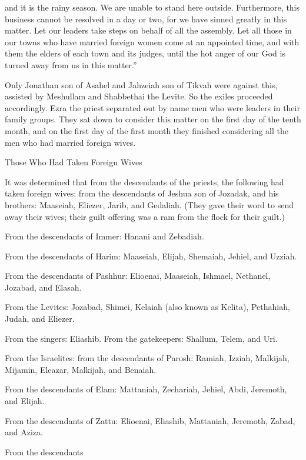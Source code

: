 {and it is the rainy
season.
We are unable
to stand
here outside.
Furthermore, this business
cannot
be resolved in a day
or
two,
for
we have sinned
greatly
in this
matter.
Let our
leaders
take steps on behalf of all
the assembly.
Let all
those
in
our towns
who
have married
foreign
women
come
at an appointed
time,
and with
them the
elders
of each town
and its judges,
until
the hot
anger
of our God
is turned away from
us in
this
matter.”
\par }{\PP {}Only
Jonathan
son
of Asahel
and Jahzeiah
son
of Tikvah
were against
this,
assisted
by Meshullam
and Shabbethai
the Levite.
So the exiles
proceeded
accordingly.
Ezra
the priest
separated out
by name
men
who were leaders
in their family groups.
They sat down
to consider
this matter
on the first
day
of the tenth
month,
and on
the first
day
of the first
month
they finished
considering
all
the men
who
had married foreign
wives.
\par }{\SH Those Who Had Taken Foreign Wives
\par }{\PP {}It
was determined
that from the descendants of
the priests,
the following
had
taken foreign
wives: from the descendants
of Jeshua
son
of Jozadak,
and his brothers: Maaseiah,
Eliezer,
Jarib,
and Gedaliah.
(They gave
their word
to send away
their wives;
their guilt offering
was a ram
from the flock
for their guilt.)
\par }{\PP {}From the descendants
of Immer: Hanani
and Zebadiah.
\par }{\PP {}From the descendants
of Harim: Maaseiah,
Elijah,
Shemaiah,
Jehiel,
and Uzziah.
\par }{\PP {}From the descendants
of Pashhur: Elioenai,
Maaseiah,
Ishmael,
Nethanel,
Jozabad,
and Elasah.
\par }{\PP {}From
the Levites: Jozabad,
Shimei,
Kelaiah
(also known as Kelita), Pethahiah,
Judah,
and Eliezer.
\par }{\PP {}From
the singers: Eliashib.
From
the gatekeepers: Shallum,
Telem,
and Uri.
\par }{\PP {}From the Israelites: from the descendants
of Parosh: Ramiah,
Izziah,
Malkijah,
Mijamin,
Eleazar,
Malkijah,
and Benaiah.
\par }{\PP {}From the descendants
of Elam: Mattaniah,
Zechariah,
Jehiel,
Abdi,
Jeremoth,
and Elijah.
\par }{\PP {}From the descendants
of Zattu: Elioenai,
Eliashib,
Mattaniah,
Jeremoth,
Zabad,
and Aziza.
\par }{\PP {}From the descendants
}
